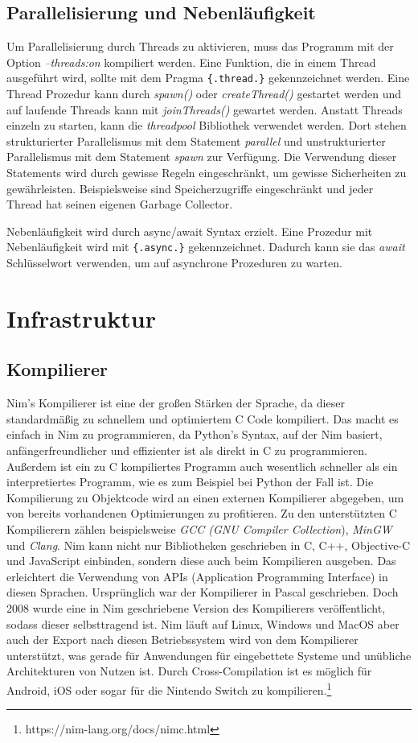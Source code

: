 \documentclass[11pt]{report}
\begin{document}
\subsection{Parallelisierung und Nebenläufigkeit}
Um Parallelisierung durch Threads zu aktivieren, muss das Programm mit der Option \emph{--threads:on} kompiliert werden. Eine Funktion, die in einem Thread ausgeführt wird, sollte mit dem Pragma \verb|{.thread.}| gekennzeichnet werden. Eine Thread Prozedur kann durch \emph{spawn()} oder \emph{createThread()} gestartet werden und auf laufende Threads kann mit \emph{joinThreads()} gewartet werden.
Anstatt Threads einzeln zu starten, kann die \emph{threadpool} Bibliothek verwendet werden. Dort stehen strukturierter Parallelismus mit dem Statement \emph{parallel} und unstrukturierter Parallelismus mit dem Statement \emph{spawn} zur Verfügung. Die Verwendung dieser Statements wird durch gewisse Regeln eingeschränkt, um gewisse Sicherheiten zu gewährleisten. Beispielsweise sind Speicherzugriffe eingeschränkt und jeder Thread hat seinen eigenen Garbage Collector.

Nebenläufigkeit wird durch async/await Syntax erzielt. Eine Prozedur mit Nebenläufigkeit wird mit \verb|{.async.}| gekennzeichnet. Dadurch kann sie das \emph{await} Schlüsselwort verwenden, um auf asynchrone Prozeduren zu warten.


\section{Infrastruktur}
\subsection{Kompilierer}
Nim's Kompilierer ist eine der großen Stärken der Sprache, da dieser standardmäßig zu schnellem und optimiertem C Code kompiliert. Das macht es einfach in Nim zu programmieren, da Python's Syntax, auf der Nim basiert, anfängerfreundlicher und effizienter ist als direkt in C zu programmieren.
Außerdem ist ein zu C kompiliertes Programm auch wesentlich schneller als ein interpretiertes Programm, wie es zum Beispiel bei Python der Fall ist.
Die Kompilierung zu Objektcode wird an einen externen Kompilierer abgegeben, um von bereits vorhandenen Optimierungen zu profitieren. Zu den unterstützten C Kompilierern zählen beispielsweise \emph{GCC (GNU Compiler Collection}), \emph{MinGW} und \emph{Clang}. Nim kann nicht nur Bibliotheken geschrieben in C, C++, Objective-C und JavaScript einbinden, sondern diese auch beim Kompilieren ausgeben. Das erleichtert die Verwendung von APIs (Application Programming Interface) in diesen Sprachen.
Ursprünglich war der Kompilierer in Pascal geschrieben. Doch 2008 wurde eine in Nim geschriebene Version des Kompilierers veröffentlicht, sodass dieser selbsttragend ist. Nim läuft auf Linux, Windows und MacOS aber auch der Export nach diesen Betriebssystem wird von dem Kompilierer unterstützt, was gerade für Anwendungen für eingebettete Systeme und unübliche Architekturen von Nutzen ist.
Durch Cross-Compilation ist es möglich für Android, iOS oder sogar für die Nintendo Switch zu kompilieren.\footnote{https://nim-lang.org/docs/nimc.html}
\end{document}
